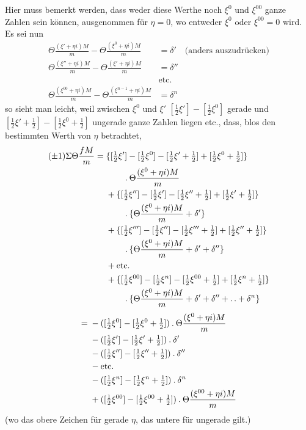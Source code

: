 Hier muss bemerkt werden, dass weder diese Werthe noch $\xi^0$ und $\xi^{00}$ ganze Zahlen sein können, ausgenommen für $\eta=0$, wo entweder $\xi^0$ oder $\xi^{00}=0$ wird. Es sei nun
\[
\begin{aligned}
\Theta\frac{(\xi'+\eta i)M}{m}-\Theta\frac{(\xi^0+\eta i)M}{m}&=\delta'\quad\text{(anders auszudrücken)}\\
\Theta\frac{(\xi''+\eta i)M}{m}-\Theta\frac{(\xi'+\eta i)M}{m}&=\delta''\\
&\text{etc.}\\
\Theta\frac{(\xi^{00}+\eta i)M}{m}-\Theta\frac{(\xi^{n-1}+\eta i)M}{m}&=\delta^n
\end{aligned}
\]
%
so sieht man leicht, weil zwischen $\xi^0$ und $\xi'$ $[\frac12\xi']-[\frac12\xi^0]$ gerade und $[\frac12\xi'+\frac12]-[\frac12\xi^0+\frac12]$ ungerade ganze Zahlen liegen etc., dass, blos den bestimmten Werth von $\eta$ betrachtet,
\[
\begin{aligned}
(\pm1)\Sigma\Theta\frac{fM}{m}
={}&\{[\tfrac12\xi']-[\tfrac12\xi^0]-[\tfrac12\xi'+\tfrac12]+[\tfrac12\xi^0+\tfrac12]\}\\
&\qquad\mathbin{.}\Theta\frac{(\xi^0+\eta i)M}{m}\\
&+\{[\tfrac12\xi'']-[\tfrac12\xi']-[\tfrac12\xi''+\tfrac12]+[\tfrac12\xi'+\tfrac12]\}\\
&\qquad\mathbin{.}\{\Theta\frac{(\xi^0+\eta i)M}{m}+\delta'\}\\
&+\{[\tfrac12\xi''']-[\tfrac12\xi'']-[\tfrac12\xi'''+\tfrac12]+[\tfrac12\xi''+\tfrac12]\}\\
&\qquad\mathbin{.}\{\Theta\frac{(\xi^0+\eta i)M}{m}+\delta'+\delta''\}\\
&+\text{etc.}\\
&+\{[\tfrac12\xi^{00}]-[\tfrac12\xi^n]-[\tfrac12\xi^{00}+\tfrac12]+[\tfrac12\xi^n+\tfrac12]\}\\
&\qquad\mathbin{.}\{\Theta\frac{(\xi^0+\eta i)M}{m}+\delta'+\delta''+\mathinner{.\,.}+\delta^n\}
\end{aligned}
\]
\[
\begin{aligned}
={}&-([\tfrac12\xi^0]-[\tfrac12\xi^0+\tfrac12])\mathbin{.}\Theta\frac{(\xi^0+\eta i)M}{m}\\
&-([\tfrac12\xi']-[\tfrac12\xi'+\tfrac12])\mathbin{.}\delta'\\
&-([\tfrac12\xi'']-[\tfrac12\xi''+\tfrac12])\mathbin{.}\delta''\\
&-\text{etc.}\\
&-([\tfrac12\xi^n]-[\tfrac12\xi^n+\tfrac12])\mathbin{.}\delta^n\\
&+([\tfrac12\xi^{00}]-[\tfrac12\xi^{00}+\tfrac12])\mathbin{.}\Theta\frac{(\xi^{00}+\eta i)M}{m}
\end{aligned}
\]
(wo das obere Zeichen für gerade $\eta$, das untere für ungerade gilt.)

